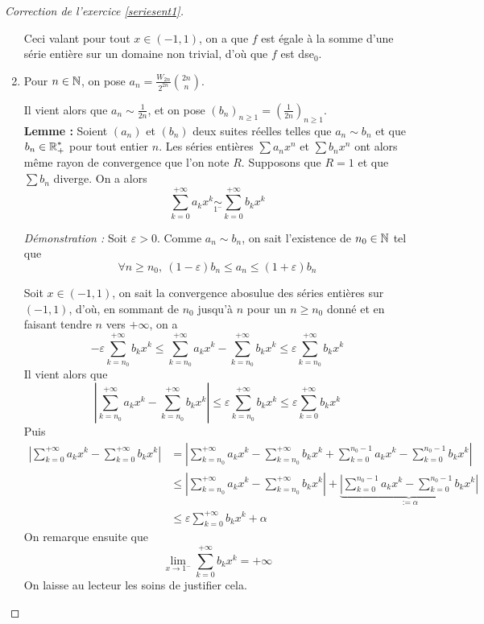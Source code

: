 \begin{proof}[Correction de l'exercice \ref{seriesent1}]
\begin{enumerate}
		Ceci valant pour tout $x\in(-1,1)$, on a que $f$ est égale à la somme d'une série entière sur un domaine non trivial, d'où que $f$ est dse${}_0$.

		\item Pour $n\in\operatorname{\mathbb N}$, on pose $a_n=\frac{W_{2n}}{2^{2n}}\binom{2n}n$.


		Il vient alors que $a_n\sim \frac1{2n}$, et on pose $(b_n)_{n\geq 1}=\left(\frac1{2n}\right)_{n\geq 1}$.\\


		\textbf{Lemme : } Soient $(a_n)$ et $(b_n)$ deux suites réelles telles que $a_n\sim b_n$ et que $b_n\in\operatorname{\mathbb R}_+^*$ pour tout entier $n$. Les séries entières $\displaystyle\sum a_nx^n$ et $\displaystyle\sum b_nx^n$ ont alors même rayon de convergence que l'on note $R$. Supposons que $R = 1$ et que $\displaystyle\sum b_n$ diverge. On a alors \[\sum_{k=0}^{+\infty}a_kx^k\underset{1^{-}}{\sim}\sum_{k=0}^{+\infty}b_kx^k\]


		\textit{Démonstration : } Soit $\varepsilon > 0$. Comme $a_n\sim b_n$, on sait l'existence de $n_0\in\operatorname{\mathbb N}$ tel que \[\forall n\geq n_0,\ (1-\varepsilon)b_n\leq a_n\leq (1+\varepsilon)b_n\]

		Soit $x\in(-1,1)$, on sait la convergence abosulue des séries entières sur $(-1,1)$, d'où, en sommant de $n_0$ jusqu'à $n$ pour un $n\geq n_0$ donné et en faisant tendre $n$ vers $+\infty$, on a 
		\[-\varepsilon\sum_{k=n_0}^{+\infty}b_kx^k\leq \sum_{k=n_0}^{+\infty}a_kx^k-\sum_{k=n_0}^{+\infty}b_kx^k\leq\varepsilon\sum_{k=n_0}^{+\infty}b_kx^k\]
		Il vient alors que \[\left |\sum_{k=n_0}^{+\infty}a_kx^k-\sum_{k=n_0}^{+\infty}b_kx^k \right|\leq \varepsilon\sum_{k=n_0}^{+\infty}b_kx^k\leq\varepsilon\sum_{k=0}^{+\infty}b_kx^k\]
		Puis 
		\begin{align*}
			\left |\sum_{k=0}^{+\infty}a_kx^k-\sum_{k=0}^{+\infty}b_kx^k \right| & =  \left |\sum_{k=n_0}^{+\infty}a_kx^k-\sum_{k=n_0}^{+\infty}b_kx^k + \sum_{k=0}^{n_0-1}a_kx^k-\sum_{k=0}^{n_0-1}b_kx^k\right|\\
																					 & \leq \left |\sum_{k=n_0}^{+\infty}a_kx^k-\sum_{k=n_0}^{+\infty}b_kx^k \right| + \underbrace{\left|\sum_{k=0}^{n_0-1}a_kx^k-\sum_{k=0}^{n_0-1}b_kx^k\right|}_{:=\alpha}\\
																					 & \leq \varepsilon\sum_{k=0}^{+\infty}b_kx^k + \alpha
		\end{align*}
		On remarque ensuite que \[\lim_{x\to1^-}\sum_{k=0}^{+\infty}b_kx^k=+\infty\]
		On laisse au lecteur les soins de justifier cela.



\end{enumerate}
\end{proof}
